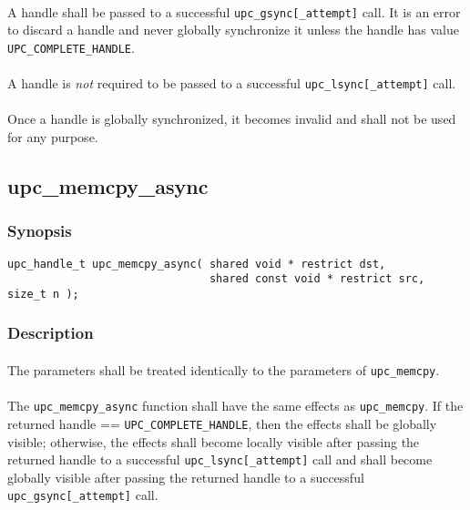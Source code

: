 \documentclass[10pt]{article}
\def \memcpy  {{\tt upc\_memcpy}}
\def \gsync  {{\tt upc\_gsync[\_attempt]}}
\def \lsync  {{\tt upc\_lsync[\_attempt]}}
\def \complete {{\tt UPC\_COMPLETE\_HANDLE}}
\begin{document}
\paragraph{} A handle shall be passed to a successful \gsync{} call.  It is an
error to discard a handle and never globally synchronize it unless the handle
has value \complete{}. 

\paragraph{} A handle is {\em not} required to be passed to a successful
\lsync{} call.

\paragraph{} Once a handle is globally synchronized, it becomes invalid and
shall not be used for any purpose.

\newpage
\subsection{upc\_memcpy\_async}
\def\function{{\tt upc\_memcpy\_async}}

\subsubsection{Synopsis}

\begin{verbatim}
upc_handle_t upc_memcpy_async( shared void * restrict dst,
                               shared const void * restrict src, size_t n );
\end{verbatim}

\subsubsection{Description}

\paragraph{} The parameters shall be treated identically to the parameters of
\memcpy{}.

\paragraph{} The \function{} function shall have the same effects as \memcpy{}.
If the returned handle == \complete{}, then the effects shall be globally
visible; otherwise, the effects shall become locally visible after passing the
returned handle to a successful \lsync{} call and shall become globally visible
after passing the returned handle to a successful \gsync{} call.
\end{document}
